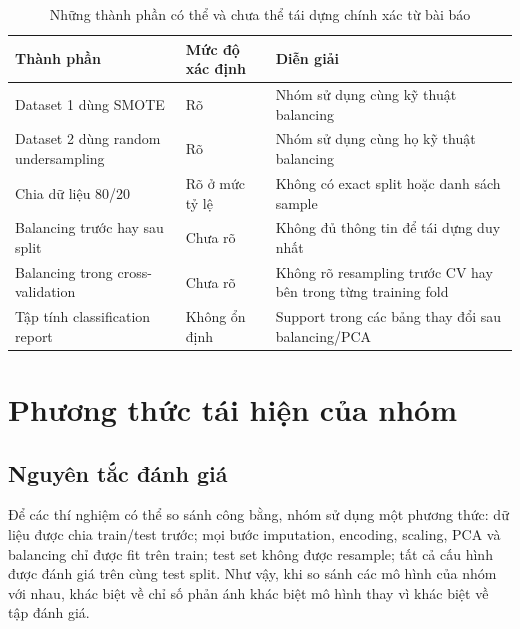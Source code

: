 \begin{table}[H]
\centering
\small
\caption{Những thành phần có thể và chưa thể tái dựng chính xác từ bài báo}
\label{tab:paper_protocol_clarity}
\begin{tabular}{p{5.0cm}p{3.0cm}p{6.0cm}}
\toprule
\textbf{Thành phần} & \textbf{Mức độ xác định} & \textbf{Diễn giải}\\
\midrule
Dataset 1 dùng SMOTE & Rõ & Nhóm sử dụng cùng kỹ thuật balancing \\
Dataset 2 dùng random undersampling & Rõ & Nhóm sử dụng cùng họ kỹ thuật balancing \\
Chia dữ liệu 80/20 & Rõ ở mức tỷ lệ & Không có exact split hoặc danh sách sample \\
Balancing trước hay sau split & Chưa rõ & Không đủ thông tin để tái dựng duy nhất \\
Balancing trong cross-validation & Chưa rõ & Không rõ resampling trước CV hay bên trong từng training fold \\
Tập tính classification report & Không ổn định & Support trong các bảng thay đổi sau balancing/PCA \\
\bottomrule
\end{tabular}
\end{table}

\section{Phương thức tái hiện của nhóm}

\subsection{Nguyên tắc đánh giá}

Để các thí nghiệm có thể so sánh công bằng, nhóm sử dụng một phương thức: dữ liệu được chia train/test trước; mọi bước imputation, encoding, scaling, PCA và balancing chỉ được fit trên train; test set không được resample; tất cả cấu hình được đánh giá trên cùng test split. Như vậy, khi so sánh các mô hình của nhóm với nhau, khác biệt về chỉ số phản ánh khác biệt mô hình thay vì khác biệt về tập đánh giá.

